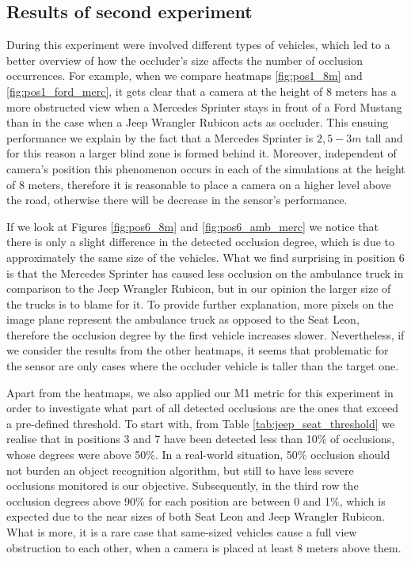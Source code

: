 \subsection{Results of second experiment}
During this experiment were involved different types of vehicles, which led to a better overview of how the occluder's size affects the number of occlusion occurrences. For example, when we compare heatmaps \ref{fig:pos1_8m} and \ref{fig:pos1_ford_merc}, it gets clear that a camera at the height of 8 meters has a more obstructed view when a Mercedes Sprinter stays in front of a Ford Mustang than in the case when a Jeep Wrangler Rubicon acts as occluder. This ensuing performance we explain by the fact that a Mercedes Sprinter is $2,5-3 m$ tall and for this reason a larger blind zone is formed behind it. Moreover, independent of camera's position this phenomenon occurs in each of the simulations at the height of 8 meters, therefore it is reasonable to place a camera on a higher level above the road, otherwise there will be decrease in the sensor's performance.

If we look at Figures \ref{fig:pos6_8m} and \ref{fig:pos6_amb_merc} we notice that there is only a slight difference in the detected occlusion degree, which is due to approximately the same size of the vehicles. What we find surprising in position 6 is that the Mercedes Sprinter has caused less occlusion on the ambulance truck in comparison to the Jeep Wrangler Rubicon, but in our opinion the larger size of the trucks is to blame for it. To provide further explanation, more pixels on the image plane represent the ambulance truck as opposed to the Seat Leon, therefore the occlusion degree by the first vehicle increases slower. Nevertheless, if we consider the results from the other heatmaps, it seems that problematic for the sensor are only cases where the occluder vehicle is taller than the target one.

Apart from the heatmaps, we also applied our M1 metric for this experiment in order to investigate what part of all detected occlusions are the ones that exceed a pre-defined threshold. To start with, from Table \ref{tab:jeep_seat_threshold} we realise that in positions 3 and 7 have been detected less than 10\% of occlusions, whose degrees were above 50\%. In a real-world situation, 50\% occlusion should not burden an object recognition algorithm, but still to have less severe occlusions monitored is our objective. Subsequently, in the third row the occlusion degrees above 90\% for each position are between 0 and 1\%, which is expected due to the near sizes of both Seat Leon and Jeep Wrangler Rubicon. What is more, it is a rare case that same-sized vehicles cause a full view obstruction to each other, when a camera is placed at least 8 meters above them.


